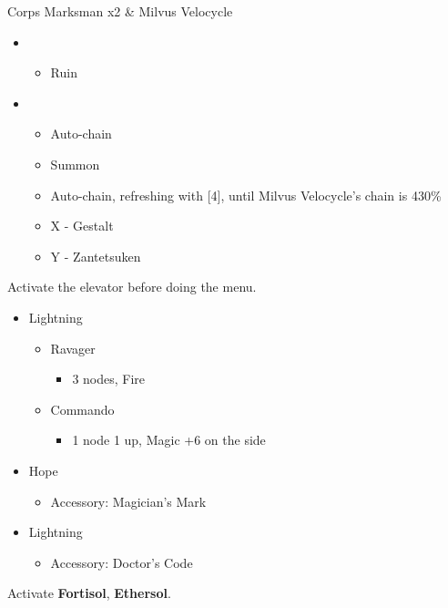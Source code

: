  

\begin{battle}{Corps Marksman x2 \& Milvus Velocycle}
\begin{itemize}
    \item \first
    \begin{itemize}
        \item Ruin
    \end{itemize}
    \item \fifth
    \begin{itemize}
        \item Auto-chain
        \item Summon
        \item Auto-chain, refreshing with [4], until Milvus Velocycle's chain is 430\%
        \item X - Gestalt
        \item Y - Zantetsuken
    \end{itemize}
\end{itemize}
\end{battle}
\newpage
Activate the elevator before doing the menu.
\begin{menu}
\begin{multicols}{2}
\begin{itemize}
    \crystarium
    \begin{itemize}
        \item Lightning
        \begin{itemize}
            \item Ravager
            \begin{itemize}
                \item 3 nodes, Fire
            \end{itemize}
            \item Commando
            \begin{itemize}
                \item 1 node 1 up, Magic +6 on the side
            \end{itemize}
        \end{itemize}
    \end{itemize}
    \columnbreak
    \equip
    \begin{itemize}
        \item Hope
        \begin{itemize}
                \item Accessory: Magician's Mark
        \end{itemize}
        \item Lightning
        \begin{itemize}
                \item Accessory: Doctor's Code
        \end{itemize}
    \end{itemize}
\end{itemize}
\end{multicols}
\end{menu}
Activate \textbf{Fortisol}, \textbf{Ethersol}.

